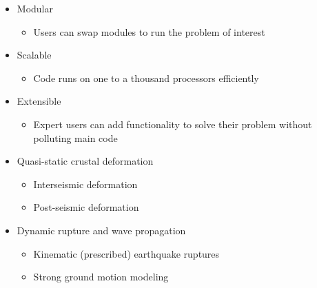 \documentclass[pdftex,cig,slideColor]{pp4slides}
\begin{document}
  
  \begin{itemize}
  \item Modular
    \begin{itemize}
    \item Users can swap modules to run the problem of interest
    \end{itemize}
  \item Scalable
    \begin{itemize}
    \item Code runs on one to a thousand processors efficiently
    \end{itemize}    
  \item Extensible
    \begin{itemize}
    \item Expert users can add functionality to solve their problem
      without polluting main code
    \end{itemize}
  \end{itemize}


  \begin{itemize}
  \item Quasi-static crustal deformation
    \begin{itemize}
    \item Interseismic deformation
    \item Post-seismic deformation
    \end{itemize}
  \item Dynamic rupture and wave propagation
    \begin{itemize}
    \item Kinematic (prescribed) earthquake ruptures
    \item Strong ground motion modeling
    \end{itemize}
  \end{itemize}

\end{document}
